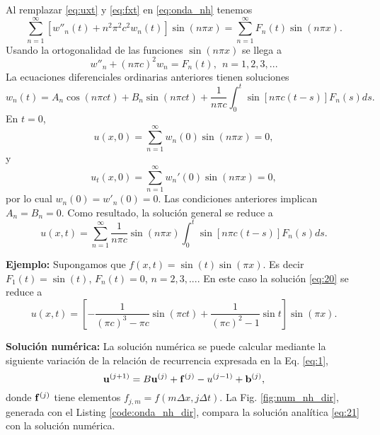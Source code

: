 \documentclass[11pt]{article}
\begin{document}
Al remplazar \eqref{eq:uxt} y \eqref{eq:fxt} en \eqref{eq:onda_nh} tenemos
\begin{equation}
  \label{eq:14}
  \sum_{n=1}^\infty \left[w''_n(t) + n^2\pi^2c^2 w_n(t)\right]\sin(n\pi x) = \sum_{n=1}^\infty F_n(t)\sin(n\pi x).
\end{equation}
Usando la ortogonalidad de las funciones $\sin(n\pi x)$ se llega a
\begin{equation}
  \label{eq:15}
  w''_n + (n\pi c)^2 w_n = F_n(t),~~n=1,2,3,...
\end{equation}
La ecuaciones diferenciales ordinarias anteriores tienen soluciones 
\begin{equation}
  \label{eq:17}
  w_n(t) = A_n \cos(n\pi ct) + B_n \sin(n\pi ct) + \frac{1}{n\pi c}\int_0^t \sin[n\pi c(t-s)]F_n(s)ds.
\end{equation}
En $t=0$,
\begin{equation}
  \label{eq:18}
  u(x,0) = \sum_{n=1}^\infty w_n(0)\sin(n\pi x) = 0,
\end{equation}
y
\begin{equation}
  \label{eq:18}
  u_t(x,0) = \sum_{n=1}^\infty w_n'(0)\sin(n\pi x) = 0,
\end{equation}
por lo cual $w_n(0) = w'_n(0)=0$. Las condiciones anteriores implican $A_n = B_n = 0$. Como resultado, la soluci\'on general se reduce a
\begin{equation}
  \label{eq:20}
  u(x,t) = \sum_{n=1}^\infty \frac{1}{n\pi c} \sin(n\pi x) \int_0^t \sin[n\pi c(t-s)]F_n(s)ds.
\end{equation}

{\bf Ejemplo:} Supongamos que $f(x,t) = \sin(t)\sin(\pi x)$. Es decir $F_1(t) = \sin(t)$, $F_n(t) = 0$, $n=2,3,...$. En este caso la soluci\'on \eqref{eq:20} se reduce a 
\begin{equation}
  \label{eq:21}
  u(x,t) =  \left[-\frac{1}{(\pi c)^3 - \pi c}\sin(\pi ct) +
    \frac{1}{(\pi c)^2 - 1}\sin t \right] \sin(\pi x).
\end{equation}

{\bf Soluci\'on num\'erica:} La soluci\'on num\'erica se puede calcular mediante la siguiente variaci\'on de la relaci\'on de recurrencia expresada en la Eq. \eqref{eq:1},
\begin{equation}
  \label{eq:22}
    {\bf u}^{(j+1)} = B{\bf u}^{(j)} + {\bf f}^{(j)}- u^{(j-1)} + {\bf b}^{(j)},
\end{equation}
donde ${\bf f}^{(j)}$ tiene elementos $f_{j,m} = f(m\Delta x, j\Delta t)$. La Fig. \ref{fig:num_nh_dir}, generada con el Listing \eqref{code:onda_nh_dir}, compara la soluci\'on anal\'itica \eqref{eq:21} con la soluci\'on num\'erica. 
\end{document}
